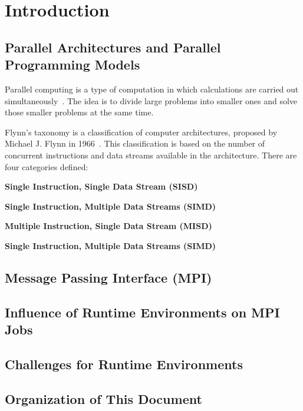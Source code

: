 \chapter{Introduction}
\label{sec:Introduction}

\section{Parallel Architectures and Parallel Programming Models}
\label{sec:Introduction}

Parallel computing is a type of computation in which calculations are carried out simultaneously~\cite{Almasi:1989:HPC:160438}. The idea is to divide large problems into smaller ones and solve those smaller problems at the same time.

Flynn's taxonomy is a classification of computer architectures, proposed by Michael J. Flynn in 1966~\cite{5009071,44900}. This classification is based on the number of concurrent instructions and data streams available in the architecture.
There are four categories defined:

\bf{Single Instruction, Single Data Stream (SISD)}

\bf{Single Instruction, Multiple Data Streams (SIMD)}

\bf{Multiple Instruction, Single Data Stream (MISD)}

\bf{Single Instruction, Multiple Data Streams (SIMD)}


\section{Message Passing Interface (MPI)}
\label{sec:Introduction}


\section{Influence of Runtime Environments on MPI Jobs}
\label{sec:Introduction}


\section{Challenges for Runtime Environments}
\label{sec:Introduction}


\section{Organization of This Document}
\label{sec:Introduction}

